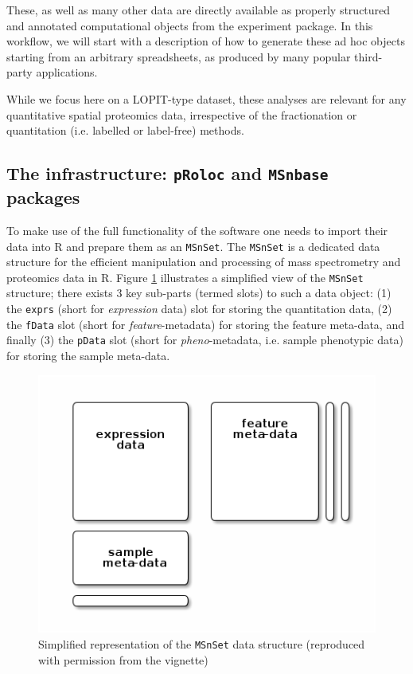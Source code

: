 These, as well as many other data are directly available as properly
structured and annotated computational objects from the 
 experiment package. In this workflow, we
will start with a description of how to generate these ad hoc objects
starting from an arbitrary spreadsheets, as produced by many popular
third-party applications. 

While we focus here on a LOPIT-type dataset, these analyses are
relevant for any quantitative spatial proteomics data, irrespective of
the fractionation or quantitation (i.e. labelled or label-free)
methods.

\subsection*{The infrastructure: \texttt{pRoloc} and \texttt{MSnbase} packages}

To make use of the full functionality of the  software
one needs to import their data into R and prepare them as an
\texttt{MSnSet}. The \texttt{MSnSet} is a dedicated data structure for
the efficient manipulation and processing of mass spectrometry and
proteomics data in R. Figure \ref{fig:msnset} illustrates a simplified view of the
\texttt{MSnSet} structure; there exists 3 key sub-parts (termed slots)
to such a data object: (1) the \texttt{exprs} (short for
\textit{expression} data) slot for storing the quantitation data, (2)
the \texttt{fData} slot (short for \textit{feature}-metadata) for
storing the feature meta-data, and finally (3) the \texttt{pData} slot
(short for \textit{pheno}-metadata, i.e. sample phenotypic data) for
storing the sample meta-data.

\begin{figure}[!ht]
  \centering
  \includegraphics[width=.5\textwidth]{./Figures/msnset.png}
  \caption{Simplified representation of the \texttt{MSnSet} data
    structure (reproduced with permission from the 
    vignette)}
  \label{fig:msnset}
\end{figure}

